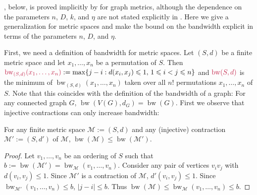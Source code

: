\documentclass{patmorin}
\makeatletter
\renewcommand{\le}{\leqslant}
\newcommand{\david}[1]{{\color{orange} David: #1}}
\newcommand{\pat}[1]{\textcolor{Maroon}{Pat: #1}}
\def\mathcolor#1#{\@mathcolor{#1}}
\def\@mathcolor#1#2#3{%
  \protect\leavevmode
  \begingroup
    \color#1{#2}#3%
  \endgroup
}
\newcommand{\mathdefin}[1]{\mathcolor{brightmaroon}{#1}}
\DeclareMathOperator{\bw}{bw}
\makeatother
\begin{document}
, below, is proved implicitly by \citet{feige:approximating} for graph metrics, although the dependence on the parameters $n$, $D$, $k$, and $\eta$ are not stated explicitly in \cite{feige:approximating}. Here we give a generalization for metric spaces and make the bound on the bandwidth explicit in terms of the parameters $n$, $D$, and $\eta$.

First, we need a definition of bandwidth for metric spaces.  Let $(S,d)$ be a finite metric space and let $x_1,\ldots,x_n$ be a permutation of $S$.  Then $\mathdefin{\bw_{(S,d)}(x_1,\ldots,x_n)}:=\max\{j-i:d(x_i,x_j)\le 1,\, 1\le i <j\le n\}$ and $\mathdefin{\bw(S,d)}$ is the minimum of $\bw_{(S,d)}(x_1,\ldots,x_n)$ taken over all $n!$ permutations $x_1,\ldots,x_n$ of $S$.  Note that this coincides with the definition of the bandwidth of a graph: For any connected graph $G$, $\bw(V(G),d_G)=\bw(G)$.  First we observe that injective
contractions can only increase bandwidth:

\begin{obs}\label{contraction_increases_bandwidth}
  For any finite metric space $\mathcal{M}:=(S,d)$ and any (injective) contraction $\mathcal{M}':=(S,d')$ of $\mathcal{M}$, $\bw(\mathcal{M}) \le \bw(\mathcal{M}')$.
\end{obs}

\begin{proof}
  Let $v_1,\ldots,v_n$ be an ordering of $S$ such that $b:=\bw(\mathcal{M}')=\bw_{\mathcal{M}}(v_1,\ldots,v_n)$. Consider any pair of vertices $v_iv_j$ with $d(v_i,v_j) \le 1$. Since $\mathcal{M}'$ is a contraction of $\mathcal{M}$, $d'(v_i,v_j)\le 1$.  Since $\bw_{\mathcal{M}'}(v_1,\ldots,v_n)\le b$, $|j-i|\le b$.  Thus $\bw(\mathcal{M})\le \bw_{\mathcal{M}}(v_1,\ldots,v_n)\le b$.
\end{proof}
\end{document}

